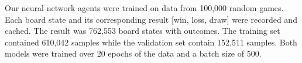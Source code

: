 

Our neural network agents were trained on data from 100,000 random games.
Each board state and its corresponding result [win, loss, draw] were recorded and cached.
The result was 762,553 board states with outcomes.
The training set contained 610,042 samples while the validation set contain 152,511 samples.
Both models were trained over 20 epochs of the data and a batch size of 500.
